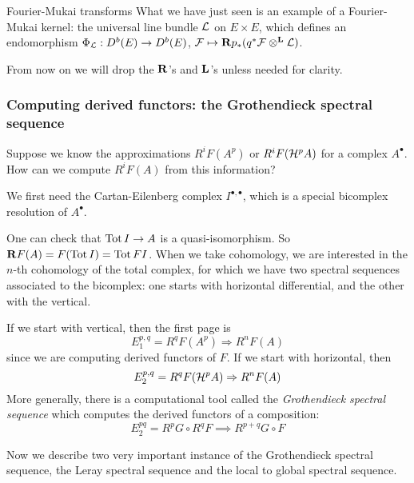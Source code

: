 \begin{remark}{Fourier-Mukai transforms}{}
    What we have just seen is an example of a Fourier-Mukai kernel: the universal line bundle $\mathcal{L}$ on $E\times E$, which defines an endomorphism $\Phi_{\mathcal{L}}:D^b(E)\to D^b(E)$, $\mathcal{F}\mapsto\mathbf{R} p_*(q^*\mathcal{F}\otimes^{\mathbf{L}}\mathcal{L})$.
\end{remark}

From now on we will drop the $\mathbf{R}$'s and $\mathbf{L}$'s unless needed for clarity.

\subsubsection{Computing derived functors: the Grothendieck spectral sequence}

Suppose we know the approximations $R^iF(A^p)$ or $R^iF(\mathcal{H}^pA)$ for a complex $A^\bullet$. How can we compute $R^iF(A)$ from this information?

We first need the Cartan-Eilenberg complex $I^{\bullet, \bullet}$, which is a special bicomplex resolution of $A^\bullet$.

One can check that $\operatorname{Tot} I \to A$ is a quasi-isomorphism. So $\mathbf{R} F(A)=F(\operatorname{Tot} I)=\operatorname{Tot} FI$. When we take cohomology, we are interested in the $n$-th cohomology of the total complex, for which we have two spectral sequences associated to the bicomplex: one starts with horizontal differential, and the other with the vertical.

If we start with vertical, then the first page is
\begin{equation*}
    E_1^{p,q} = R^qF(A^p) \Rightarrow R^nF(A)
\end{equation*}
since we are computing derived functors of $F$. If we start with horizontal, then
\begin{equation*}
    E_2^{p,q} = R^qF(\mathcal{H}^pA) \Rightarrow R^nF(A)
\end{equation*}
More generally, there is a computational tool called the \emph{Grothendieck spectral sequence} which computes the derived functors of a composition: $$E_2^{pq}=R^pG \circ R^q F\implies R^{p+q}G\circ F$$

Now we describe two very important instance of the Grothendieck spectral sequence, the Leray spectral sequence and the local to global spectral sequence.

